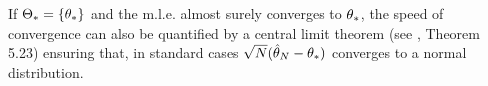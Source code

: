 If $\Theta_* = \{\theta_*\}$ and the m.l.e. almost surely converges to $\theta_*$, the speed of convergence can also be quantified by a central limit theorem (see \citet{van2000asymptotic}, Theorem 5.23) ensuring that, in standard cases $\sqrt N({\hat{\theta}}_N - \theta_*)$ converges to a normal distribution. 

%
%
%
%
